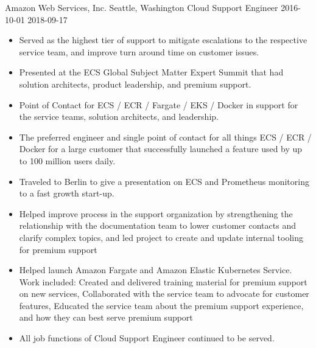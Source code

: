 \roleheader
    {Amazon Web Services, Inc.}
    {Seattle, Washington}
    {Cloud Support Engineer }
    {2016-10-01}
    {2018-09-17}

\begin{itemize} \itemsep 0pt
    \item Served as the highest tier of support to mitigate escalations to the respective service team, and improve turn around time on customer issues.
    \item Presented at the ECS Global Subject Matter Expert Summit that had solution architects, product leadership, and premium support.
    \item Point of Contact for ECS / ECR / Fargate / EKS / Docker in support for the service teams, solution architects, and leadership.
    \item The preferred engineer and single point of contact for all things ECS / ECR / Docker for a large customer that successfully launched a feature used by up to 100 million users daily.
    \item Traveled to Berlin to give a presentation on ECS and Prometheus monitoring to a fast growth start-up.
    \item Helped improve process in the support organization by strengthening the relationship with the documentation team to lower customer contacts and clarify complex topics, and led project to create and update internal tooling for premium support
    \item Helped launch Amazon Fargate and Amazon Elastic Kubernetes Service. Work included: Created and delivered training material for premium support on new services, Collaborated with the service team to advocate for customer features, Educated the service team about the premium support experience, and how they can best serve premium support
    \item All job functions of Cloud Support Engineer  continued to be served.
\end{itemize}